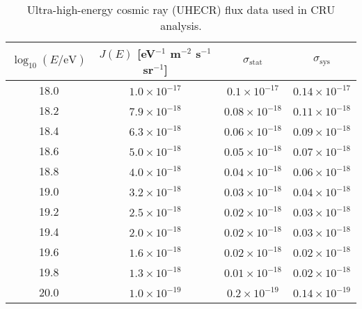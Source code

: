 \begin{table}[h!]
\centering
\caption{Ultra-high-energy cosmic ray (UHECR) flux data used in CRU analysis.}
\label{tab:uhecr_flux}
\begin{tabular}{c c c c}
\toprule
$\log_{10}(E/\mathrm{eV})$ & $J(E)$ [eV$^{-1}$ m$^{-2}$ s$^{-1}$ sr$^{-1}$] & $\sigma_{\text{stat}}$ & $\sigma_{\text{sys}}$ \\
\midrule
18.0 & $1.0 \times 10^{-17}$ & $0.1 \times 10^{-17}$ & $0.14 \times 10^{-17}$ \\
18.2 & $7.9 \times 10^{-18}$ & $0.08 \times 10^{-18}$ & $0.11 \times 10^{-18}$ \\
18.4 & $6.3 \times 10^{-18}$ & $0.06 \times 10^{-18}$ & $0.09 \times 10^{-18}$ \\
18.6 & $5.0 \times 10^{-18}$ & $0.05 \times 10^{-18}$ & $0.07 \times 10^{-18}$ \\
18.8 & $4.0 \times 10^{-18}$ & $0.04 \times 10^{-18}$ & $0.06 \times 10^{-18}$ \\
19.0 & $3.2 \times 10^{-18}$ & $0.03 \times 10^{-18}$ & $0.04 \times 10^{-18}$ \\
19.2 & $2.5 \times 10^{-18}$ & $0.02 \times 10^{-18}$ & $0.03 \times 10^{-18}$ \\
19.4 & $2.0 \times 10^{-18}$ & $0.02 \times 10^{-18}$ & $0.03 \times 10^{-18}$ \\
19.6 & $1.6 \times 10^{-18}$ & $0.02 \times 10^{-18}$ & $0.02 \times 10^{-18}$ \\
19.8 & $1.3 \times 10^{-18}$ & $0.01 \times 10^{-18}$ & $0.02 \times 10^{-18}$ \\
20.0 & $1.0 \times 10^{-19}$ & $0.2 \times 10^{-19}$ & $0.14 \times 10^{-19}$ \\
\bottomrule
\end{tabular}
\end{table}

